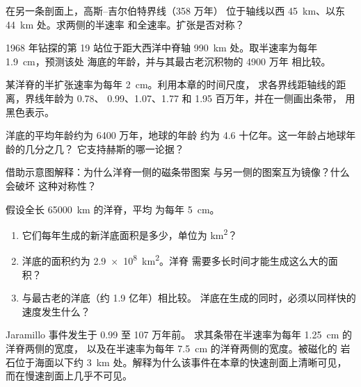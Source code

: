 \begin{exercise}[$\star\star$]\label{exo:g11:drift-to-spreading:7}
在另一条剖面上，高斯–吉尔伯特界线（358 万年）
位于轴线以西 \qty{45}{km}、以东 \qty{44}{km} 处。求两侧的半速率
和全速率。扩张是否对称？
\end{exercise}

\begin{exercise}[$\star\star$]\label{exo:g11:drift-to-spreading:8}
1968 年钻探的第 19 站位于距大西洋中脊轴
\qty{990}{km} 处。取半速率为每年 \qty{1.9}{cm}，预测该处
海底的年龄，并与其最古老沉积物的 4900 万年
相比较。
\end{exercise}

\begin{exercise}[$\star\star$]\label{exo:g11:drift-to-spreading:9}
某洋脊的半扩张速率为每年 \qty{2}{cm}。利用本章的时间尺度，
求各界线距轴线的距离，界线年龄为 0.78、
0.99、1.07、1.77 和 1.95 百万年，并在一侧画出条带，
用黑色表示。
\end{exercise}

\begin{exercise}[$\star\star$]\label{exo:g11:drift-to-spreading:10}
洋底的平均年龄约为 6400 万年，地球的年龄
约为 \num{4.6} 十亿年。这一年龄占地球年龄的几分之几？
它支持赫斯的哪一论据？
\end{exercise}

\begin{exercise}[$\star\star$]\label{exo:g11:drift-to-spreading:11}
借助示意图解释：为什么洋脊一侧的磁条带图案
与另一侧的图案互为镜像？什么会破坏
这种对称性？
\end{exercise}

\begin{exercise}[$\star\star\star$]\label{exo:g11:drift-to-spreading:12}
假设全长 \qty{65000}{km} 的洋脊，平均
为每年 \qty{5}{cm}。
\begin{enumerate}
  \item 它们每年生成的新洋底面积是多少，单位为 \unit{km^2}？
  \item 洋底的面积约为 \qty{2.9e8}{km^2}。洋脊
        需要多长时间才能生成这么大的面积？
  \item 与最古老的洋底（约 1.9 亿年）相比较。
        洋底在生成的同时，必须以同样快的速度发生什么？
\end{enumerate}
\end{exercise}

\begin{exercise}[$\star\star\star$]\label{exo:g11:drift-to-spreading:13}
Jaramillo 事件发生于 \num{0.99} 至 107 万年前。
求其条带在半速率为每年 \qty{1.25}{cm} 的洋脊两侧的宽度，
以及在半速率为每年 \qty{7.5}{cm} 的洋脊两侧的宽度。被磁化的
岩石位于海面以下约 \qty{3}{km} 处。解释为什么该事件在本章的快速剖面上清晰可见，
而在慢速剖面上几乎不可见。
\end{exercise}

